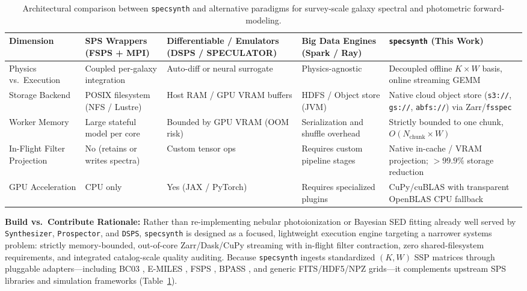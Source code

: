 \documentclass[preprint,12pt,authoryear]{elsarticle}
\begin{document}
\begin{table}[t]
\centering
\caption{Architectural comparison between \texttt{specsynth} and alternative paradigms for survey-scale galaxy spectral and photometric forward-modeling.}
\label{tab:arch_comparison}
\footnotesize
\setlength{\tabcolsep}{4pt}
\begin{tabular}{@{}p{2.5cm}p{2.9cm}p{2.9cm}p{2.9cm}p{3.4cm}@{}}
\toprule
\textbf{Dimension} & \textbf{SPS Wrappers (FSPS + MPI)} & \textbf{Differentiable / Emulators (DSPS / SPECULATOR)} & \textbf{Big Data Engines (Spark / Ray)} & \textbf{\texttt{specsynth} (This Work)} \\
\midrule
Physics vs.\ Execution & Coupled per-galaxy integration & Auto-diff or neural surrogate & Physics-agnostic & Decoupled offline $K\times W$ basis, online streaming GEMM \\
Storage Backend & POSIX filesystem (NFS / Lustre) & Host RAM / GPU VRAM buffers & HDFS / Object store (JVM) & Native cloud object store (\texttt{s3://}, \texttt{gs://}, \texttt{abfs://}) via Zarr/\texttt{fsspec} \\
Worker Memory & Large stateful model per core & Bounded by GPU VRAM (OOM risk) & Serialization and shuffle overhead & Strictly bounded to one chunk, $O(N_{\text{chunk}} \times W)$ \\
In-Flight Filter Projection & No (retains or writes spectra) & Custom tensor ops & Requires custom pipeline stages & Native in-cache / VRAM projection; $>99.9\%$ storage reduction \\
GPU Acceleration & CPU only & Yes (JAX / PyTorch) & Requires specialized plugins & CuPy/cuBLAS with transparent OpenBLAS CPU fallback \\
\bottomrule
\end{tabular}
\end{table}

\textbf{Build vs.\ Contribute Rationale:} Rather than re-implementing nebular photoionization or Bayesian SED fitting already well served by \texttt{Synthesizer}, \texttt{Prospector}, and \texttt{DSPS}, \texttt{specsynth} is designed as a focused, lightweight execution engine targeting a narrower systems problem: strictly memory-bounded, out-of-core Zarr/Dask/CuPy streaming with in-flight filter contraction, zero shared-filesystem requirements, and integrated catalog-scale quality auditing. Because \texttt{specsynth} ingests standardized $(K, W)$ SSP matrices through pluggable adapters---including BC03 \citep{bruzual2003stellar}, E-MILES \citep{vazdekis2016uv}, FSPS \citep{conroy2009propagation}, BPASS \citep{eldridge2017binary}, and generic FITS/HDF5/NPZ grids---it complements upstream SPS libraries and simulation frameworks (Table~\ref{tab:arch_comparison}).
\end{document}
